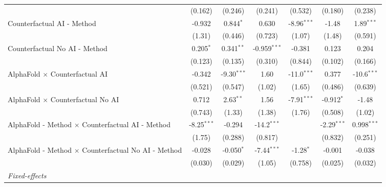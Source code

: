 \begin{tabular}{lcccccc}
                                                              & (0.162)       & (0.246)       & (0.241)        & (0.532)       & (0.180)       & (0.238)\\   
   Counterfactual AI - Method                                 & -0.932        & 0.844$^{*}$   & 0.630          & -8.96$^{***}$ & -1.48         & 1.89$^{***}$\\   
                                                              & (1.31)        & (0.446)       & (0.723)        & (1.07)        & (1.48)        & (0.591)\\   
   Counterfactual No AI - Method                              & 0.205$^{*}$   & 0.341$^{**}$  & -0.959$^{***}$ & -0.381        & 0.123         & 0.204\\   
                                                              & (0.123)       & (0.135)       & (0.310)        & (0.844)       & (0.102)       & (0.166)\\   
   AlphaFold $\times$ Counterfactual AI                       & -0.342        & -9.30$^{***}$ & 1.60           & -11.0$^{***}$ & 0.377         & -10.6$^{***}$\\   
                                                              & (0.521)       & (0.547)       & (1.02)         & (1.65)        & (0.486)       & (0.639)\\   
   AlphaFold $\times$ Counterfactual No AI                    & 0.712         & 2.63$^{**}$   & 1.56           & -7.91$^{***}$ & -0.912$^{*}$  & -1.48\\   
                                                              & (0.743)       & (1.33)        & (1.38)         & (1.76)        & (0.508)       & (1.02)\\   
   AlphaFold - Method $\times$ Counterfactual AI - Method     & -8.25$^{***}$ & -0.294        & -14.2$^{***}$  &               & -2.29$^{***}$ & 0.998$^{***}$\\   
                                                              & (1.75)        & (0.288)       & (0.817)        &               & (0.832)       & (0.251)\\   
   AlphaFold - Method $\times$ Counterfactual No AI - Method  & -0.028        & -0.050$^{*}$  & -7.44$^{***}$  & -1.28$^{*}$   & -0.001        & -0.038\\   
                                                              & (0.030)       & (0.029)       & (1.05)         & (0.758)       & (0.025)       & (0.032)\\   
   \midrule
   \emph{Fixed-effects}\\

\end{tabular}
